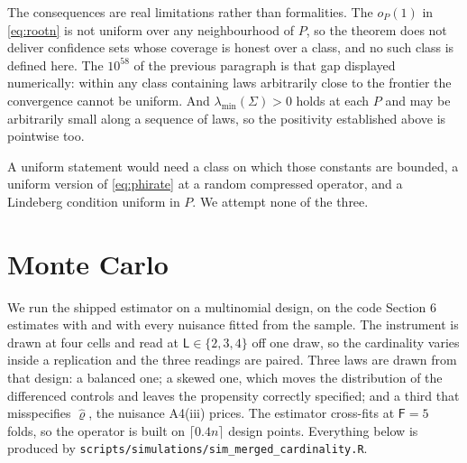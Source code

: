 \documentclass[
  12pt]{article}
\newcommand{\1}[1]{\mathds{1}\left[#1\right]}
\theoremstyle{plain}
\theoremstyle{definition}
\theoremstyle{definition}
\theoremstyle{remark}
\begin{document}
The consequences are real limitations rather than formalities. The
\(o_P(1)\) in \eqref{eq:rootn} is not uniform over any neighbourhood of
\(P\), so the theorem does not deliver confidence sets whose coverage is
honest over a class, and no such class is defined here. The \(10^{58}\)
of the previous paragraph is that gap displayed numerically: within any
class containing laws arbitrarily close to the frontier the convergence
cannot be uniform. And \(\lambda_{\min}(\Sigma)>0\) holds at each \(P\)
and may be arbitrarily small along a sequence of laws, so the positivity
established above is pointwise too.

A uniform statement would need a class on which those constants are
bounded, a uniform version of \eqref{eq:phirate} at a random compressed
operator, and a Lindeberg condition uniform in \(P\). We attempt none of
the three.

\section{Monte Carlo}\label{monte-carlo}


We run the shipped estimator on a multinomial design, on the code
Section 6 estimates with and with every nuisance fitted from the sample.
The instrument is drawn at four cells and read at
\(\mathsf L\in\{2,3,4\}\) off one draw, so the cardinality varies inside
a replication and the three readings are paired. Three laws are drawn
from that design: a balanced one; a skewed one, which moves the
distribution of the differenced controls and leaves the propensity
correctly specified; and a third that misspecifies \(\hat\varrho\), the
nuisance A4(iii) prices. The estimator cross-fits at \(\mathsf F=5\)
folds, so the operator is built on \(\lceil0.4n\rceil\) design points.
Everything below is produced by
\texttt{scripts/simulations/sim\_merged\_cardinality.R}.
\end{document}
